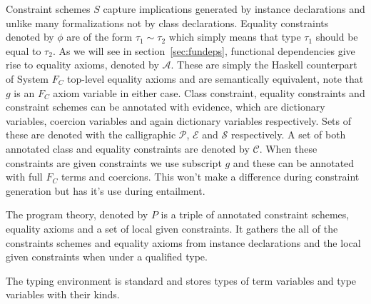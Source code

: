 Constraint schemes $S$ capture implications generated by instance declarations
and unlike many formalizations not by class declarations. Equality constraints
denoted by $\phi$ are of the form $\tau_1 \sim \tau_2$ which simply means that
type $\tau_1$ should be equal to $\tau_2$. As we will see in
section~\ref{sec:fundeps}, functional dependencies give rise to equality axioms,
denoted by $\mathcal{A}$. These are simply the Haskell counterpart of System
$F_C$ top-level equality axioms and are semantically equivalent, note that $g$
is an $F_C$ axiom variable in either case. Class constraint, equality
constraints and constraint schemes can be annotated with evidence, which are
dictionary variables, coercion variables and again dictionary variables
respectively. Sets of these are denoted with the calligraphic $\mathcal{P}$,
$\mathcal{E}$ and $\mathcal{S}$ respectively. A set of both annotated class and
equality constraints are denoted by $\mathcal{C}$. When these constraints are
given constraints we use subscript $g$ and these can be annotated with full
$F_C$ terms and coercions. This won't make a difference during constraint
generation but has it's use during entailment.

The program theory, denoted by $P$ is a triple of annotated constraint schemes,
equality axioms and a set of local given constraints. It gathers the all of the
constraints schemes and equality axioms from instance declarations and the local
given constraints when under a qualified type.

The typing environment is standard and stores types of term variables and type
variables with their kinds.



